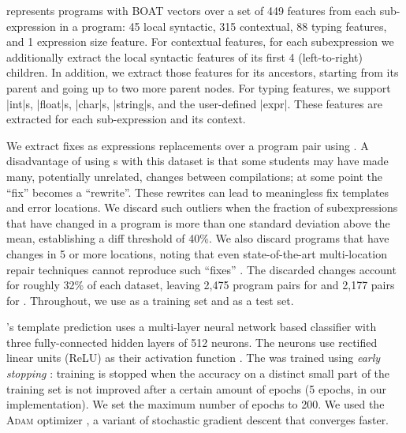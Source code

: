 %
\toolname represents programs with BOAT vectors over a set of 449
features from
each sub-expression in a program: 45 local syntactic, 315
contextual, 88 typing features, and 1 expression size feature.
For contextual features, for each subexpression we
additionally extract the local syntactic features of its first 4
(left-to-right) children. In addition, we extract those features for its
ancestors, starting from its parent and going up to two more parent nodes.
For typing features, we support |int|s, |float|s, |char|s, |string|s, and
    the user-defined |expr|. These features are extracted for each
    sub-expression and its context.
%

%
We extract fixes as expressions replacements over a program pair using \diffsym.
A disadvantage of using \diffsym s with this dataset is that some students may
have made many, potentially unrelated, changes between compilations; at some
point the ``fix'' becomes a ``rewrite''. These rewrites can lead to meaningless
fix templates and error locations. We discard such outliers when the fraction of
subexpressions that have changed in a program is more than one standard
deviation above the mean, establishing a diff threshold of 40\%. We also discard
programs that have changes in 5 or more locations, noting that even
state-of-the-art multi-location repair techniques cannot reproduce such
``fixes'' \citep{Saha_2019}. The discarded changes account for roughly 32\% of each
dataset, leaving 2,475 program pairs for \SPRING and 2,177 pairs for \FALL.
Throughout, we use \SPRING as a training set and \FALL as a test set.

%
\toolname's template prediction uses a multi-layer neural network \dnn based
classifier with three fully-connected hidden layers of 512 neurons. The neurons
use rectified linear units (ReLU) as their activation function
\citep{Nair2010-xg}.
%
The \dnn was trained using \emph{early stopping} \citep{Hastie2009-bn}: training
is stopped when the accuracy on a distinct small part of the training set is not
improved after a certain amount of epochs (5 epochs, in our implementation).
%
We set the maximum number of epochs to 200.
%
We used the \textsc{Adam} optimizer \citep{Kingma2014-ng},
a variant of stochastic gradient descent that converges faster.

